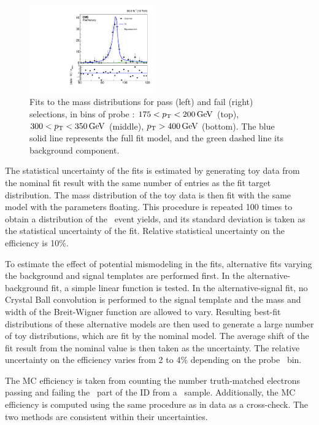 \begin{figure}[htbp]
\begin{center}
    \includegraphics[width=0.48\textwidth]{Calibration/Figures/idsf/fit_data_fail_pt_400_6500.pdf}
    \caption{
      Fits to the mass distributions for pass (left) and fail (right) selections, in bins of probe \pt: 
      $175 < p_{\mathrm{T}} < 200\,\text{Ge\hspace{-.08em}V}$ (top), 
      $300 < p_{\mathrm{T}} < 350\,\text{Ge\hspace{-.08em}V}$ (middle), 
      $p_{\mathrm{T}} > 400\,\text{Ge\hspace{-.08em}V}$ (bottom). 
      The blue solid line represents the full fit model, and the green dashed line its background component.
    }
    \label{fig:idsf_fits}
  \end{center}
\end{figure}

The statistical uncertainty of the fits is estimated by generating toy data from the nominal fit result with the same number of entries as the fit target distribution. 
The mass distribution of the toy data is then fit with the same model with the parameters floating. 
This procedure is repeated 100 times to obtain a distribution of the \Zee\ event yields, and its standard deviation is taken as the statistical uncertainty of the fit. 
Relative statistical uncertainty on the efficiency is 10\%. %

To estimate the effect of potential mismodeling in the fits, alternative fits varying the background and signal templates are performed first. 
In the alternative-background fit, a simple linear function is tested.
In the alternative-signal fit, no Crystal Ball convolution is performed to the signal template and the mass and width of the Breit-Wigner function are allowed to vary. 
Resulting best-fit distributions of these alternative models are then used to generate a large number of toy distributions, which are fit by the nominal model. 
The average shift of the fit result from the nominal value is then taken as the uncertainty. The relative uncertainty on the efficiency varies from 2 to 4\% depending on the probe \pt\ bin. %

The MC efficiency is taken from counting the number truth-matched electrons passing and failing the \egamma\ part of the ID from a \Zee\ sample. 
Additionally, the MC efficiency is computed using the same procedure as in data as a cross-check. The two methods are consistent within their uncertainties. 

